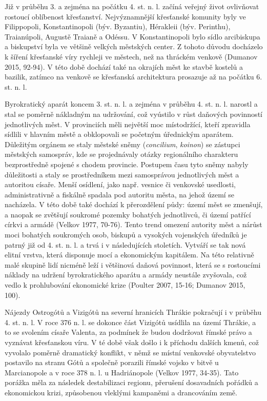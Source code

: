 Již v průběhu 3. a zejména na počátku 4. st. n. l. začíná veřejný život ovlivňovat rostoucí oblíbenost křesťanství. Nejvýznamnější křesťanské komunity byly ve Filippopoli, Konstantinopoli (býv. Byzantiu), Hérakleii (býv. Perinthu), Traianúpoli, Augustě Traianě a Odéssu. V Konstantinopoli bylo sídlo arcibiskupa a biskupství byla ve většině velkých městských center. Z tohoto důvodu docházelo k šíření křesťanské víry rychleji ve městech, než na thráckém venkově (Dumanov 2015, 92-94). V této době dochází také na okrajích měst ke stavbě kostelů a bazilik, zatímco na venkově se křesťanská architektura prosazuje až na počátku 6. st. n. l.

Byrokratický aparát koncem 3. st. n. l. a zejména v průběhu 4. st. n. l. narostl a stal se poměrně nákladným na udržování, což vyústilo v růst daňových povinností jednotlivých měst. V provinciích měli největší moc místodržící, kteří zpravidla sídlili v hlavním městě a obklopovali se početným úřednickým aparátem. Důležitým orgánem se staly městské sněmy ({\em concilium}, {\em koinon}) se zástupci městských samospráv, kde se projednávaly otázky regionálního charakteru bezprostředně spojené s chodem provincie. Postupem času tyto sněmy nabyly důležitosti a staly se prostředníkem mezi samosprávou jednotlivých měst a autoritou císaře. Menší osídlení, jako např. vesnice či venkovské usedlosti, administrativně a fiskálně spadala pod autoritu města, na jehož území se nacházela. V této době také dochází k přerozdělení půdy: území měst se zmenšují, a naopak se zvětšují soukromé pozemky bohatých jednotlivců, či území patřící církvi a armádě (Velkov 1977, 70-76). Tento trend omezení autority měst a nárůst moci bohatých soukromých osob, biskupů a vysokých vojenských úředníků je patrný již od 4. st. n. l. a trvá i v následujících stoletích. Vytváří se tak nová elitní vrstva, která disponuje mocí a ekonomickým kapitálem. Na této relativně malé skupině lidí nicméně leží i většinová daňová povinnost, která se s rostoucími náklady na udržení byrokratického aparátu a armády neustále zvyšovala, což vedlo k prohlubování ekonomické krize (Poulter 2007, 15-16; Dumanov 2015, 100).

Nájezdy Ostrogótů a Vizigótů na severní hranicích Thrákie pokračují i v průběhu 4. st. n. l. V roce 376 n. l. se dokonce část Vizigótů usídlila na území Thrákie, a to se svolením císaře Valenta, za podmínek že budou dodržovat římské právo a vyznávat křesťanskou víru. V té době však došlo i k příchodu dalších kmenů, což vyvolalo poměrně dramatický konflikt, v němž se místní venkovské obyvatelstvo postavilo na stranu Gótů a společně porazili římské vojsko v bitvě u Marcianopole a v roce 378 n. l. u Hadriánopole (Velkov 1977, 34-35). Tato porážka měla za následek destabilizaci regionu, přerušení dosavadních pořádků a ekonomickou krizi, způsobenou vleklými kampaněmi a drancováním země.

